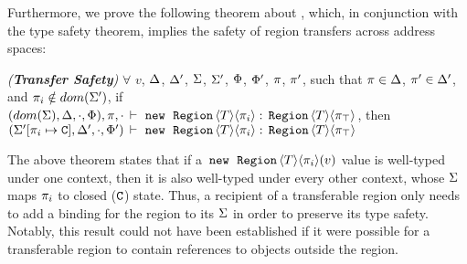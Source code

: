 Furthermore, we prove the following theorem about \FB, which, in
conjunction with the type safety theorem, implies the safety of region
transfers across address spaces:
\begin{theorem}
\emph{(\textbf{Transfer Safety})}
\label{thm:fb-transfer-safety-stmt}
$\forall$ $v$, $\Delta$, $\Delta'$, $\Sigma$, $\Sigma'$, $\Phi$,
$\Phi'$, $\pi$, $\pi'$, such that $\pi \in \Delta$, $\pi' \in \Delta'$, and
$\pi_i \notin dom(\Sigma')$, if $(dom(\Sigma),\Delta,\cdot,\Phi),\pi,
\cdot\,\vdash\,\,{\tt new}\,\; \,{\tt Region}\,\langle T \rangle\langle \pi_i \rangle:\,{\tt Region}\,\langle T \rangle\langle \pi_{\top} \rangle$, then
$(\Sigma'[\pi_i \mapsto \mathtt{C}],\Delta',\cdot,\Phi')\,\vdash\,\,{\tt new}\,\; \,{\tt Region}\,\langle T \rangle\langle \pi_i \rangle:\,{\tt Region}\,\langle T \rangle\langle \pi_{\top} \rangle$
\end{theorem}
The above theorem states that if a $\,{\tt new}\,\; \,{\tt Region}\,\langle T \rangle\langle \pi_i \rangle(v)$ value
is well-typed under one context, then it is also well-typed under
every other context, whose $\Sigma$ maps $\pi_i$ to closed
($\mathtt{C}$) state.  Thus, a recipient of a transferable region only
needs to add a binding for the region to its $\Sigma$ in order to
preserve its type safety. Notably, this result could not have been
established if it were possible for a transferable region to contain
references to objects outside the region.

